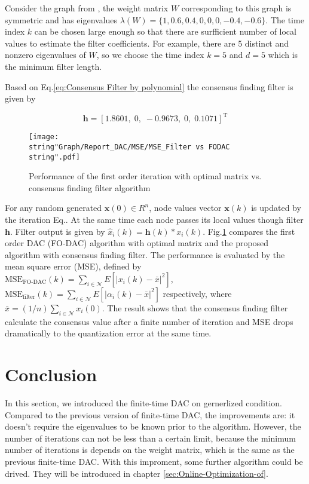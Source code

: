 Consider the graph from \cite{Xiao2004}, the weight matrix \textbf{$W$}
corresponding to this graph is symmetric and has eigenvalues $\lambda(W)=\{1,0.6,0.4,0,0,0,-0.4,-0.6\}$.
The time index $k$ can be chosen large enough so that there are surfficient
number of local values to estimate the filter coefficients.  For example,
there are 5 distinct and nonzero eigenvalues of \textbf{$W$}, so
we choose the time index $k=5$ and $d=5$ which is the minimum filter
length.

 Based on Eq.\ref{eq:Consensus Filter by polynomial}  the consensus
finding filter is given by

\[
\mathbf{h}=\left[1.8601,\;0,\;-0.9673,\;0,\;0.1071\right]^{\mathrm{T}}
\]


\begin{figure}
\hfill{}\texttt{[image: \\string"Graph/Report\_DAC/MSE/MSE\_Filter vs FODAC\\string".pdf]}\hfill{}

\caption{\label{cap:perform. Consensus Filter}Performance of the first order
iteration with optimal matrix vs. consensus finding filter algorithm}
\end{figure}


For any random generated $\mathbf{x}(0)\in R^{n}$, node values vector
$\mathbf{x}(k)$ is updated by the iteration Eq..
At the same time each node passes its local values though filter $\mathbf{h}$.
Filter output is given by $\hat{x}_{i}(k)=\mathbf{h}(k)*x_{i}(k)$.
Fig.\ref{cap:perform. Consensus Filter} compares the first order
DAC (FO-DAC) algorithm with optimal matrix and the proposed algorithm
with consensus finding filter. The performance is evaluated by the
mean square error (MSE), defined by $\mbox{MSE}_{\mbox{FO-DAC}}(k)=\sum_{i\in\mathcal{N}}E[\left|x_{i}(k)-\bar{x}\right|^{2}]$,
$\mbox{MSE}_{\mbox{filter}}(k)=\sum_{i\in\mathcal{N}}E[\left|\alpha_{i}(k)-\bar{x}\right|^{2}]$
respectively, where $\bar{x}=(1/n)\sum_{i\in\mathcal{N}}x_{i}(0)$.
The result shows that the consensus finding filter calculate the consensus
value after a finite number of iteration and MSE drops dramatically
to the quantization error at the same time. 


\section{Conclusion}

In this section, we introduced the finite-time DAC on gernerlized
condition. Compared to the previous version of finite-time DAC, the
improvements are: it doesn't require the eigenvalues to be known prior
to the algorithm. However, the number of iterations can not be less
than a certain limit, because the minimum number of iterations is
depends on the weight matrix, which is the same as the previous finite-time
DAC. With this improment, some further algorithm could be drived.
They will be introduced in chapter \ref{sec:Online-Optimization-of}.

